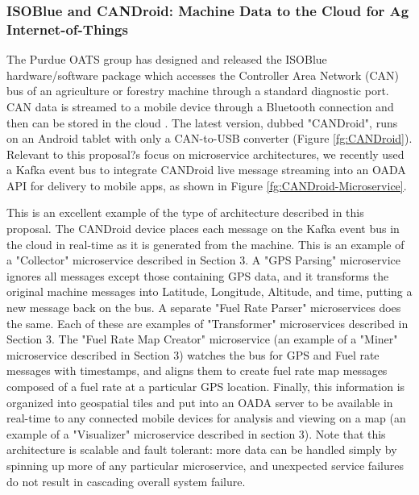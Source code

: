 \documentclass[11pt]{article}
\begin{document}
\subsubsection{ISOBlue and CANDroid: Machine Data to the Cloud for Ag Internet-of-Things}   

The Purdue OATS group has designed and released the ISOBlue hardware/software package which accesses the 
Controller Area Network (CAN) bus of an agriculture or forestry machine through a standard diagnostic port. CAN 
data is streamed to a mobile device through a Bluetooth connection and then can be stored in the cloud \cite{Layton:14}. 
The latest version, dubbed "CANDroid", runs on an Android tablet with only a CAN-to-USB converter (Figure \ref{fg:CANDroid}).
Relevant to this proposal?s focus on microservice architectures, we recently used a Kafka event bus to integrate 
CANDroid live message streaming into an OADA API for delivery to mobile apps, as shown in Figure \ref{fg:CANDroid-Microservice}.  

This is an 
excellent example of the type of architecture described in this proposal.  The CANDroid device places each message on the 
Kafka event bus in the cloud in real-time as it is generated from the machine.  This is an example of a "Collector" 
microservice described in Section 3.  A "GPS Parsing" microservice ignores all messages except those containing 
GPS data, and it transforms the original machine messages into Latitude, Longitude, Altitude, and time, putting a new 
message back on the bus.  A separate "Fuel Rate Parser" microservices does the same.  Each of these are examples 
of "Transformer" microservices described in Section 3.  The "Fuel Rate Map Creator" microservice (an example of 
a "Miner" microservice described in Section 3) watches the bus for GPS and Fuel rate messages with timestamps, 
and aligns them to create fuel rate map messages composed of a fuel rate at a particular GPS location.  Finally, this 
information is organized into geospatial tiles and put into an OADA server to be available in real-time to any connected 
mobile devices for analysis and viewing on a map (an example of a "Visualizer" microservice described in section 3).  
Note that this architecture is scalable and fault tolerant: more data can be handled simply by spinning up more of 
any particular microservice, and unexpected service failures do not result in cascading overall system failure.  
\end{document}

